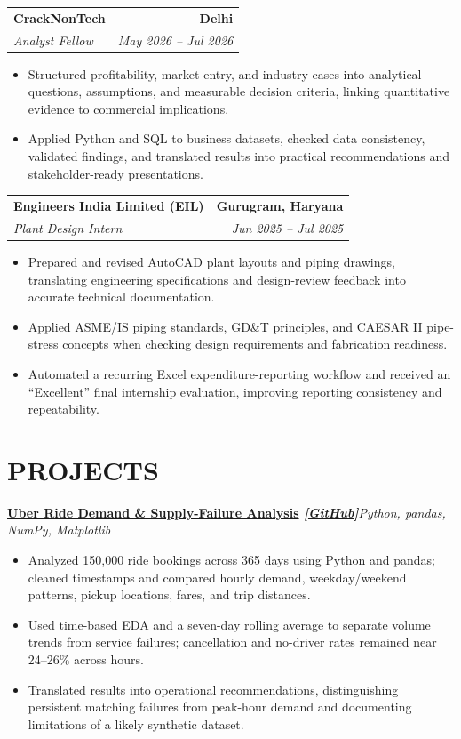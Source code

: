 \documentclass[10pt,a4paper]{article}
\makeatletter
\newcommand{\resumeSubheading}[4]{%
  \begin{tabular*}{\textwidth}{@{}l@{\extracolsep{\fill}}r@{}}
    \textbf{#1} & \textbf{#2} \\
    \textit{#3} & \textit{#4}
  \end{tabular*}\vspace{-3pt}
}
\newcommand{\resumeProject}[2]{%
  \textbf{#1}\hfill{\small\textit{#2}}\vspace{-3pt}
}
\makeatother
\begin{document}
\resumeSubheading
  {CrackNonTech}{Delhi}
  {Analyst Fellow}{May 2026 -- Jul 2026}
\begin{itemize}
  \item Structured profitability, market-entry, and industry cases into analytical questions, assumptions, and measurable decision criteria, linking quantitative evidence to commercial implications.
  \item Applied Python and SQL to business datasets, checked data consistency, validated findings, and translated results into practical recommendations and stakeholder-ready presentations.
\end{itemize}


\resumeSubheading
  {Engineers India Limited (EIL)}{Gurugram, Haryana}
  {Plant Design Intern}{Jun 2025 -- Jul 2025}
\begin{itemize}
  \item Prepared and revised AutoCAD plant layouts and piping drawings, translating engineering specifications and design-review feedback into accurate technical documentation.
  \item Applied ASME/IS piping standards, GD\&T principles, and CAESAR II pipe-stress concepts when checking design requirements and fabrication readiness.
  \item Automated a recurring Excel expenditure-reporting workflow and received an ``Excellent'' final internship evaluation, improving reporting consistency and repeatability.
\end{itemize}

\section*{PROJECTS}

\resumeProject
  {\href{https://nothing0g.github.io/analyst/projects/uber-ride-demand/}{Uber Ride Demand \& Supply-Failure Analysis}
  \hspace{3pt}\textnormal{\textit{[\href{https://github.com/Nothing0g/Uber_ride_demand_analysis}{GitHub}]}}}
  {Python, pandas, NumPy, Matplotlib}
\begin{itemize}
  \item Analyzed 150,000 ride bookings across 365 days using Python and pandas; cleaned timestamps and compared hourly demand, weekday/weekend patterns, pickup locations, fares, and trip distances.
  \item Used time-based EDA and a seven-day rolling average to separate volume trends from service failures; cancellation and no-driver rates remained near 24--26\% across hours.
  \item Translated results into operational recommendations, distinguishing persistent matching failures from peak-hour demand and documenting limitations of a likely synthetic dataset.
\end{itemize}
\end{document}
